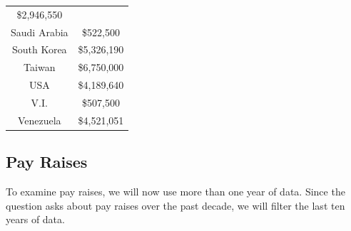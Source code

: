 \documentclass[]{book}
\theoremstyle{definition}
\theoremstyle{definition}
\theoremstyle{definition}
\theoremstyle{remark}
\begin{document}
\begin{longtable}[]{@{}cc@{}}
\begin{minipage}[t]{0.20\columnwidth}
\$2,946,550\strut
\end{minipage}\tabularnewline
\begin{minipage}[t]{0.20\columnwidth}\centering
Saudi Arabia\strut
\end{minipage} & \begin{minipage}[t]{0.20\columnwidth}\centering
\$522,500\strut
\end{minipage}\tabularnewline
\begin{minipage}[t]{0.20\columnwidth}\centering
South Korea\strut
\end{minipage} & \begin{minipage}[t]{0.20\columnwidth}\centering
\$5,326,190\strut
\end{minipage}\tabularnewline
\begin{minipage}[t]{0.20\columnwidth}\centering
Taiwan\strut
\end{minipage} & \begin{minipage}[t]{0.20\columnwidth}\centering
\$6,750,000\strut
\end{minipage}\tabularnewline
\begin{minipage}[t]{0.20\columnwidth}\centering
USA\strut
\end{minipage} & \begin{minipage}[t]{0.20\columnwidth}\centering
\$4,189,640\strut
\end{minipage}\tabularnewline
\begin{minipage}[t]{0.20\columnwidth}\centering
V.I.\strut
\end{minipage} & \begin{minipage}[t]{0.20\columnwidth}\centering
\$507,500\strut
\end{minipage}\tabularnewline
\begin{minipage}[t]{0.20\columnwidth}\centering
Venezuela\strut
\end{minipage} & \begin{minipage}[t]{0.20\columnwidth}\centering
\$4,521,051\strut
\end{minipage}\tabularnewline
\bottomrule
\end{longtable}

\hypertarget{pay-raises}{%
\subsection{Pay Raises}\label{pay-raises}}

To examine pay raises, we will now use more than one year of data. Since
the question asks about pay raises over the past decade, we will filter
the last ten years of data.
\end{document}
